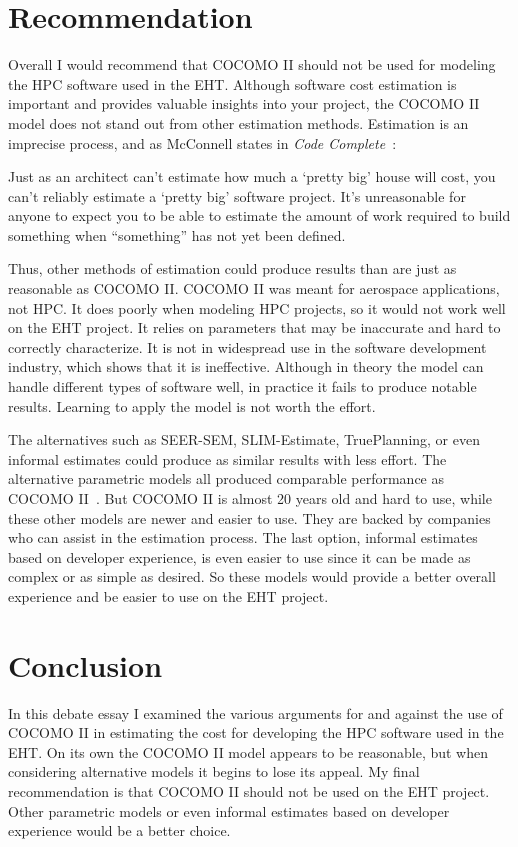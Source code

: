\documentclass[letterpaper,twocolumn,10pt]{article}
\begin{document}
\section{Recommendation}

Overall I would recommend that COCOMO II should not be used for modeling the HPC software used in the EHT. Although software cost
estimation is important and provides valuable insights into your project, the COCOMO II model does not stand out from other
estimation methods. Estimation is an imprecise process, and as McConnell states in \textit{Code Complete}~\cite{McConnell}:
\begin{displayquote}
Just as an architect can't estimate how much a
`pretty big' house will cost, you can't reliably estimate a `pretty big' software project.
It's unreasonable for anyone to expect you to be able to estimate the amount of work
required to build something when ``something'' has not yet been defined.
\end{displayquote}
Thus, other methods of estimation could produce results than are just as reasonable as COCOMO II. COCOMO II was meant for
aerospace applications, not HPC. It does poorly when modeling HPC projects, so it would not work well
on the EHT project. It relies on parameters that may be inaccurate and hard to correctly characterize. It is not in widespread use
in the software development industry, which shows that it is ineffective. Although in theory the model
can handle different types of software well, in practice it fails to produce notable results. Learning to apply the model
is not worth the effort.

The alternatives such as SEER-SEM, SLIM-Estimate, TruePlanning, or even informal estimates could produce as similar results with less effort.
The alternative parametric models all produced comparable performance as COCOMO II~\cite{Toka}. But COCOMO II is almost 20 years old and
hard to use, while these other models are newer and easier to use. They are backed by companies who can assist in the estimation process.
The last option, informal estimates based on developer experience, is even easier to use since it can be made as complex or as simple as desired.
So these models would provide a better overall experience and be easier to use on the EHT project.

\section{Conclusion}

In this debate essay I examined the various arguments for and against the use of COCOMO II in estimating the cost for developing the
HPC software used in the EHT. On its own the COCOMO II model appears to be reasonable, but when considering alternative models it
begins to lose its appeal. My final recommendation is that COCOMO II should not be used on the EHT project. Other parametric models
or even informal estimates based on developer experience would be a better choice.



\end{document}
